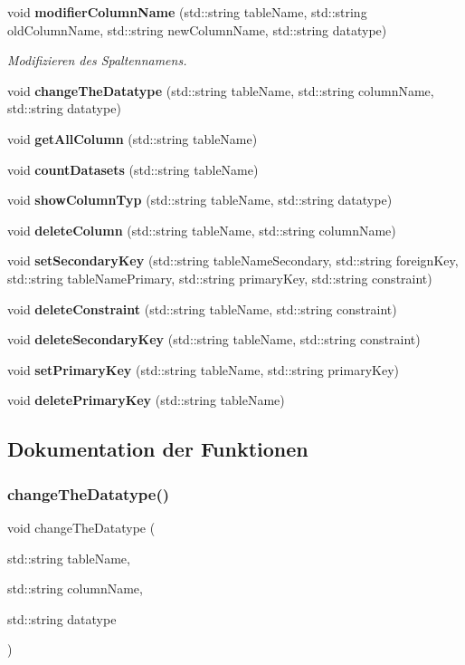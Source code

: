 \begin{DoxyCompactItemize}
void \textbf{ modifier\+Column\+Name} (std\+::string table\+Name, std\+::string old\+Column\+Name, std\+::string new\+Column\+Name, std\+::string datatype)
\begin{DoxyCompactList}\small\item\em Modifizieren des Spaltennamens. \end{DoxyCompactList}\item 
void \textbf{ change\+The\+Datatype} (std\+::string table\+Name, std\+::string column\+Name, std\+::string datatype)
\item 
void \textbf{ get\+All\+Column} (std\+::string table\+Name)
\item 
void \textbf{ count\+Datasets} (std\+::string table\+Name)
\item 
void \textbf{ show\+Column\+Typ} (std\+::string table\+Name, std\+::string datatype)
\item 
void \textbf{ delete\+Column} (std\+::string table\+Name, std\+::string column\+Name)
\item 
void \textbf{ set\+Secondary\+Key} (std\+::string table\+Name\+Secondary, std\+::string foreign\+Key, std\+::string table\+Name\+Primary, std\+::string primary\+Key, std\+::string constraint)
\item 
void \textbf{ delete\+Constraint} (std\+::string table\+Name, std\+::string constraint)
\item 
void \textbf{ delete\+Secondary\+Key} (std\+::string table\+Name, std\+::string constraint)
\item 
void \textbf{ set\+Primary\+Key} (std\+::string table\+Name, std\+::string primary\+Key)
\item 
void \textbf{ delete\+Primary\+Key} (std\+::string table\+Name)
\end{DoxyCompactItemize}


\subsection{Dokumentation der Funktionen}
\mbox{\label{tables_8cpp_aef4d6b8ba9c38e5f1b459694421ad9e5}} 
\subsubsection{change\+The\+Datatype()}
{\footnotesize\ttfamily void change\+The\+Datatype (\begin{DoxyParamCaption}\item[{std\+::string}]{table\+Name,  }\item[{std\+::string}]{column\+Name,  }\item[{std\+::string}]{datatype }\end{DoxyParamCaption})}

